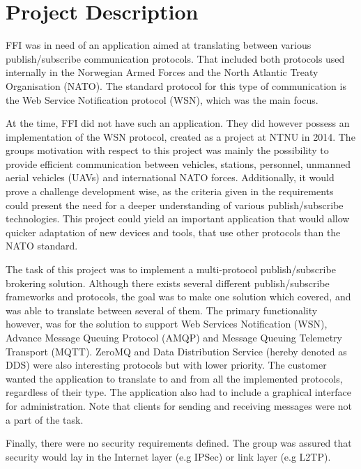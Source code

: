 \section{Project Description}
\label{sec:introduction-project_description}

FFI was in need of an application aimed at translating between various publish/subscribe communication protocols. That included both protocols used internally in the Norwegian Armed Forces and the North Atlantic Treaty Organisation (NATO). The standard protocol for this type of communication is the Web Service Notification protocol (WSN), which was the main focus.

At the time, FFI did not have such an application. They did however possess an implementation of the WSN protocol, created as a project at NTNU in 2014. The groups motivation with respect to this project was mainly the possibility to provide efficient communication between vehicles, stations, personnel, unmanned aerial vehicles (UAVs) and international NATO forces. Additionally, it would prove a challenge development wise, as the criteria given in the requirements could present the need for a  deeper understanding of various publish/subscribe technologies. This project could yield an important application that would allow quicker adaptation of new devices and tools, that use other protocols than the NATO standard.

The task of this project was to implement a multi-protocol publish/subscribe brokering solution. Although there exists several different publish/subscribe frameworks and protocols, the goal was to make one solution which covered, and was able to translate between several of them. The primary functionality however, was for the solution to support Web Services Notification (WSN), Advance Message Queuing Protocol (AMQP) and Message Queuing Telemetry Transport (MQTT). ZeroMQ and Data Distribution Service (hereby denoted as DDS) were also interesting protocols but with lower priority. The customer wanted the application to translate to and from all the implemented protocols, regardless of their type. The application also had to include a graphical interface for administration. Note that clients for sending and receiving messages were not a part of the task.

Finally, there were no security requirements defined. The group was assured that security would lay in the Internet layer (e.g IPSec) or link layer (e.g L2TP).


\clearpage